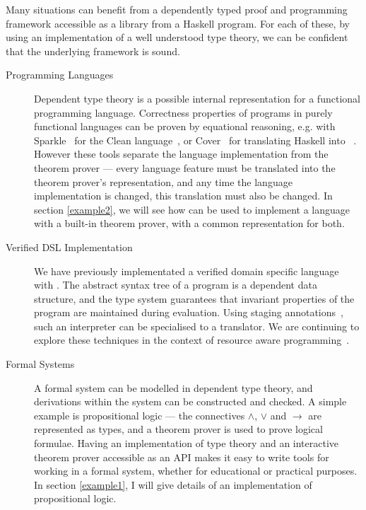 Many situations can benefit from a dependently typed proof and
programming framework accessible as a library from a Haskell program.
For each of these, by using an implementation of a well understood
type theory, we can be confident that the underlying framework is
sound.


\begin{description}
\item[Programming Languages]
Dependent type theory is a possible internal representation for a
functional programming language.
Correctness
properties of programs in purely functional languages can be proven by
equational reasoning,
e.g. with Sparkle~\cite{sparkle} for the Clean language~\cite{clean}, or
Cover~\cite{cover} for translating Haskell into
\Agda{}~\cite{agda}. However these tools
separate the language implementation from the theorem prover --- every
language feature must be translated into the theorem prover's
representation, and any time the language implementation is changed,
this translation must also be changed.
In section
\ref{example2}, we will see how \Ivor{} can be used to implement a
language with a built-in theorem prover, with a common representation
for both.

\item[Verified DSL Implementation]

We have previously implementated a verified domain specific
language~\cite{dtpmsp-gpce} with \Ivor{}.  The abstract syntax tree of
a program is a dependent data structure, and the type system
guarantees that invariant properties of the program are maintained
during evaluation.  Using staging annotations~\cite{multi-taha}, such
an interpreter can be specialised to a translator. We are continuing
to explore these techniques in the context of resource aware
programming~\cite{dt-framework}.

\item[Formal Systems]

A formal system can be modelled in dependent type theory, and
derivations within the system can be constructed and checked.
A simple example is propositional logic --- the connectives
$\land$, $\lor$ and $\to$ are represented as types, and a theorem
prover is used to prove logical formulae.  Having an implementation of
type theory and an interactive theorem prover accessible as an API
makes it easy to write tools for working in a formal system, whether
for educational or practical purposes.  In section \ref{example1}, I
will give details of an implementation of propositional logic.

\end{description}

